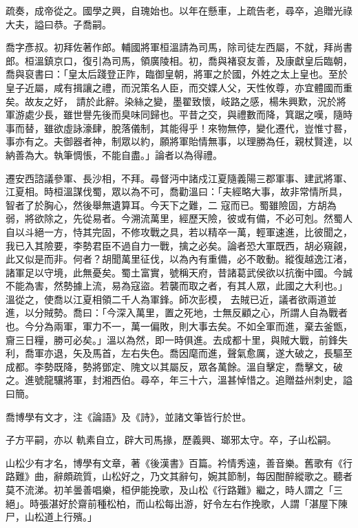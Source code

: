\begin{pinyinscope}
 疏奏，成帝從之。國學之興，自瑰始也。以年在懸車，上疏告老，尋卒，追贈光祿大夫，謚曰恭。子喬嗣。



 喬字彥叔。初拜佐著作郎。輔國將軍桓溫請為司馬，除司徒左西屬，不就，拜尚書郎。桓溫鎮京口，復引為司馬，領廣陵相。初，喬與褚裒友善，及康獻皇后臨朝，喬與裒書曰：「皇太后踐登正阼，臨御皇朝，將軍之於國，外姓之太上皇也。至於皇子近屬，咸有揖讓之禮，而況策名人臣，而交媟人父，天性攸尊，亦宜體國而重矣。故友之好，
 請於此辭。染絲之變，墨翟致懷，岐路之感，楊朱興歎，況於將軍游處少長，雖世譽先後而臭味同歸也。平昔之交，與禮數而降，箕踞之嘆，隨時事而替，雖欲虛詠濠肆，脫落儀制，其能得乎！來物無停，變化遷代，豈惟寸晷，事亦有之。夫御器者神，制眾以約，願將軍貽情無事，以理勝為任，親杖賢達，以納善為大。執筆惆悵，不能自盡。」論者以為得禮。



 遷安西諮議參軍、長沙相，不拜。尋督沔中諸戍江夏隨義陽三郡軍事、建武將軍、江夏相。時桓溫謀伐蜀，眾以為不可，喬勸溫曰：「夫經略大事，故非常情所具，智者了於胸心，然後舉無遺算耳。今天下之難，二
 寇而已。蜀雖險固，方胡為弱，將欲除之，先從易者。今溯流萬里，經歷天險，彼或有備，不必可剋。然蜀人自以斗絕一方，恃其完固，不修攻戰之具，若以精卒一萬，輕軍速進，比彼聞之，我已入其險要，李勢君臣不過自力一戰，擒之必矣。論者恐大軍既西，胡必窺覦，此又似是而非。何者？胡聞萬里征伐，以為內有重備，必不敢動。縱復越逸江渚，諸軍足以守境，此無憂矣。蜀土富實，號稱天府，昔諸葛武侯欲以抗衡中國。今誠不能為害，然勢據上流，易為寇盜。若襲而取之者，有其人眾，此國之大利也。」溫從之，使喬以江夏相領二千人為軍鋒。師次彭模，
 去賊已近，議者欲兩道並進，以分賊勢。喬曰：「今深入萬里，置之死地，士無反顧之心，所謂人自為戰者也。今分為兩軍，軍力不一，萬一偏敗，則大事去矣。不如全軍而進，棄去釜甑，齎三日糧，勝可必矣。」溫以為然，即一時俱進。去成都十里，與賊大戰，前鋒失利，喬軍亦退，矢及馬首，左右失色。喬因麾而進，聲氣愈厲，遂大破之，長驅至成都。李勢既降，勢將鄧定、隗文以其屬反，眾各萬餘。溫自擊定，喬擊文，破之。進號龍驤將軍，封湘西伯。尋卒，年三十六，溫甚悼惜之。追贈益州刺史，謚曰簡。



 喬博學有文才，注《論語》及《詩》，並諸文筆皆行於世。



 子方平嗣，亦以
 軌素自立，辟大司馬掾，歷義興、瑯邪太守。卒，子山松嗣。



 山松少有才名，博學有文章，著《後漢書》百篇。衿情秀遠，善音樂。舊歌有《行路難》曲，辭頗疏質，山松好之，乃文其辭句，婉其節制，每因酣醉縱歌之。聽者莫不流涕。初羊曇善唱樂，桓伊能挽歌，及山松《行路難》繼之，時人謂之「三絕」。時張湛好於齋前種松柏，而山松每出游，好令左右作挽歌，人謂「湛屋下陳尸，山松道上行殯。」




\end{pinyinscope}
